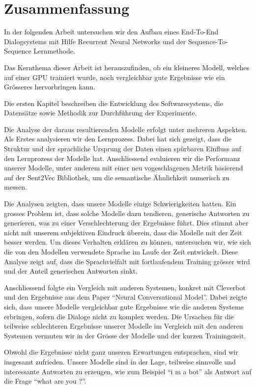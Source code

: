 \chapter*{Zusammenfassung}
In der folgenden Arbeit untersuchen wir den Aufbau eines End-To-End Dialogsystems mit Hilfe Recurrent Neural Networks und der Sequence-To-Sequence Lernmethode.

Das Kernthema dieser Arbeit ist herauszufinden, ob ein kleineres Modell, welches auf einer GPU trainiert wurde, noch vergleichbar gute Ergebnisse wie ein Grösseres hervorbringen kann.

Die ersten Kapitel beschreiben die Entwicklung des Softwaresystems, die Datensätze sowie Methodik zur Durchführung der Experimente.

Die Analyse der daraus resultierenden Modelle erfolgt unter mehreren Aspekten. Als Erstes analysieren wir den Lernprozess. Dabei hat sich gezeigt, dass die Struktur und der sprachliche Ursprung der Daten einen spürbaren Einfluss auf den Lernprozess der Modelle hat. Anschliessend evaluieren wir die Performanz unserer Modelle, unter anderem mit einer neu vogeschlagenen Metrik basierend auf der Sent2Vec Bibliothek, um die semantische Ähnlichkeit numerisch zu messen.

Die Analysen zeigten, dass unsere Modelle einige Schwierigkeiten hatten. Ein grosses Problem ist, dass solche Modelle dazu tendieren, generische Antworten zu generieren, was zu einer Verschlechterung der Ergebnisse führt. Dies stimmt aber nicht mit unserem subjektiven Eindruck überein, dass die Modelle mit der Zeit besser werden. Um dieses Verhalten erklären zu können, untersuchen wir, wie sich die von den Modellen verwendete Sprache im Laufe der Zeit entwickelt. Diese Analyse zeigt auf, dass die Sprachvielfalt mit fortlaufendem Training grösser wird und der Anteil generischen Antworten sinkt.

Anschliessend folgte ein Vergleich mit anderen Systemen, konkret mit Cleverbot und den Ergebnisse aus dem Paper ``Neural Conversational Model''. Dabei zeigte sich, dass unsere Modelle vergleichbar gute Ergebnisse wie die anderen Systeme erbringen, sofern die Dialoge nicht zu komplex werden. Die Ursachen für die teilweise schlechteren Ergebnisse unserer Modelle im Vergleich mit den anderen Systemen vermuten wir in der Grösse der Modelle und der kurzen Trainingszeit.

Obwohl die Ergebnisse nicht ganz unseren Erwartungen entsprachen, sind wir insgesamt zufrieden. Unsere Modelle sind in der Lage, teilweise sinnvolle und interessante Antworten zu erzeugen, wie zum Beispiel ``i m a bot'' als Antwort auf die Frage ``what are you ?''.
